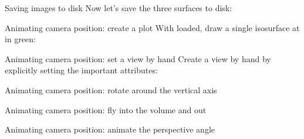 
\begin{frame}{Saving images to disk}
  \writeToDisk\pause
  Now let's save the three surfaces to disk:
  
\end{frame}

\begin{frame}{Animating camera position: create a plot}
  With  loaded, draw a single isosurface at  in green:
  
    \pause
  
\end{frame}

\begin{frame}{Animating camera position: set a view by hand}
  Create a view by hand by explicitly setting the important attributes:
  
\end{frame}

\begin{frame}{Animating camera position: rotate around the vertical axis}
  
\end{frame}

\begin{frame}{Animating camera position: fly into the volume and out}
  
\end{frame}

\begin{frame}{Animating camera position: animate the perspective angle}
  
\end{frame}

